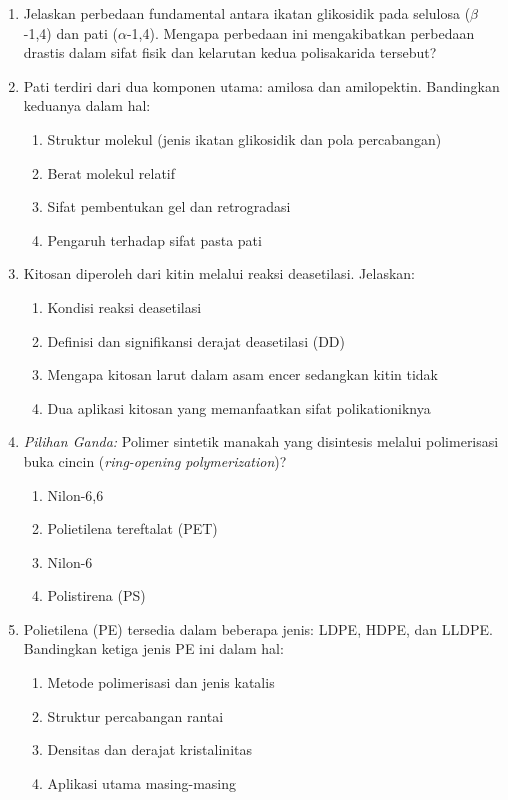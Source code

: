 \documentclass[12pt,a4paper,openany]{book}
\begin{document}
\begin{enumerate}

\item Jelaskan perbedaan fundamental antara ikatan glikosidik pada selulosa ($\beta$-1,4) dan pati ($\alpha$-1,4). Mengapa perbedaan ini mengakibatkan perbedaan drastis dalam sifat fisik dan kelarutan kedua polisakarida tersebut?

\item Pati terdiri dari dua komponen utama: amilosa dan amilopektin. Bandingkan keduanya dalam hal:
\begin{enumerate}[label=(\alph*)]
\item Struktur molekul (jenis ikatan glikosidik dan pola percabangan)
\item Berat molekul relatif
\item Sifat pembentukan gel dan retrogradasi
\item Pengaruh terhadap sifat pasta pati
\end{enumerate}

\item Kitosan diperoleh dari kitin melalui reaksi deasetilasi. Jelaskan:
\begin{enumerate}[label=(\alph*)]
\item Kondisi reaksi deasetilasi
\item Definisi dan signifikansi derajat deasetilasi (DD)
\item Mengapa kitosan larut dalam asam encer sedangkan kitin tidak
\item Dua aplikasi kitosan yang memanfaatkan sifat polikationiknya
\end{enumerate}

\item \textit{Pilihan Ganda:} Polimer sintetik manakah yang disintesis melalui polimerisasi buka cincin (\textit{ring-opening polymerization})?
\begin{enumerate}[label=(\alph*)]
\item Nilon-6,6
\item Polietilena tereftalat (PET)
\item Nilon-6
\item Polistirena (PS)
\end{enumerate}

\item Polietilena (PE) tersedia dalam beberapa jenis: LDPE, HDPE, dan LLDPE. Bandingkan ketiga jenis PE ini dalam hal:
\begin{enumerate}[label=(\alph*)]
\item Metode polimerisasi dan jenis katalis
\item Struktur percabangan rantai
\item Densitas dan derajat kristalinitas
\item Aplikasi utama masing-masing
\end{enumerate}


\end{enumerate}
\end{document}
